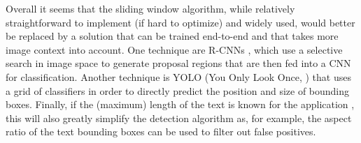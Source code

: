 \documentclass[11pt]{article}
\begin{document}
Overall it seems that the sliding window algorithm, while relatively straightforward to implement
(if hard to optimize) and widely used, would better be replaced by a solution that can be trained
end-to-end and that takes more image context into account. One technique are R-CNNs \cite{Girshick2013,Jaderberg2016},
which use a selective search in image space to generate proposal regions that are then fed
into a CNN for classification. Another technique is YOLO (You Only Look Once, \cite{Redmon}) that
uses a grid of classifiers in order to directly predict the position and size of bounding boxes.
Finally, if the (maximum) length of the text is known for the application \cite{Goodfellow2013,Li2016}, this will also greatly simplify
the detection algorithm as, for example, the aspect ratio of the text bounding boxes can be used
to filter out false positives.

\newpage


\end{document}
